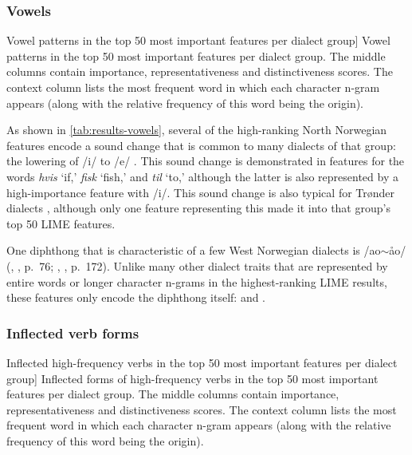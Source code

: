 \subsubsection{Vowels}

\begin{table}[htbp]

    \caption
    [Vowel patterns in the top 50 most important features per dialect group]
    {Vowel patterns in the top 50 most important features per dialect group.
    The middle columns contain importance, representativeness and distinctiveness scores.
    The context column lists the most frequent word in which each character n-gram appears (along with the relative frequency of this word being the origin).}
    \label{tab:results-vowels}
\end{table}

As shown in \autoref{tab:results-vowels}, several of the high-ranking North Norwegian features encode a sound change that is common to many dialects of that group: the lowering of /i/ to /e/ \citep[p.~189]{hanssen2010dialekter}.
This sound change is demonstrated in features for the words \textit{hvis} `if,' \textit{fisk} `fish,' and \textit{til} `to,' although the latter is also represented by a high-importance feature with /i/.
This sound change is also typical for Tr\o{}nder dialects \citep[p.~157]{hanssen2010dialekter}, although only one feature representing this made it into that group's top 50 LIME features.

One diphthong that is characteristic of a few West Norwegian dialects is /ao$\sim$\aa{}o/ (\citeauthor{sandoey1996vestlandet}, \citeyear{sandoey1996vestlandet}, p.~76; \citeauthor{hanssen2010dialekter}, \citeyear{hanssen2010dialekter}, p.~172).
Unlike many other dialect traits that are represented by entire words or longer character n-grams in the highest-ranking LIME results, these features only encode the diphthong itself:  and .


\subsubsection{Inflected verb forms}

\begin{table}[htbp]
    
    \caption
    [Inflected high-frequency verbs in the top 50 most important features per dialect group]
    {Inflected forms of high-frequency verbs in the top 50 most important features per dialect group.
    The middle columns contain importance, representativeness and distinctiveness scores.
    The context column lists the most frequent word in which each character n-gram appears (along with the relative frequency of this word being the origin).}
    \label{tab:verbs}
\end{table}

